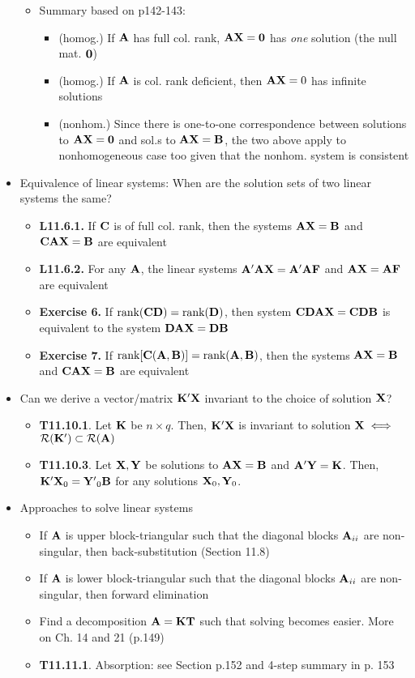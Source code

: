 \documentclass[a4paper, oneside]{book}
\begin{document}
\begin{itemize}
\begin{itemize}
	\item Summary based on p142-143:
		\begin{itemize}
		\item (homog.) If $\mathbf{A}$ has full col. rank, $\mathbf{AX}=\mathbf{0}$ has \textit{one} solution (\ie the null mat. $\mathbf{0}$)
		\item (homog.) If $\mathbf{A}$ is col. rank deficient, then $\mathbf{AX}=0$ has infinite solutions
		\item (nonhom.) Since there is one-to-one correspondence between solutions to $\mathbf{AX=0}$ and sol.s to $\mathbf{AX=B}$, the two above apply to nonhomogeneous case too given that the nonhom. system is consistent
		\end{itemize}
	\end{itemize}
\item Equivalence of linear systems: When are the solution sets of two linear systems the same?
	\begin{itemize}
	\item \textbf{L11.6.1.} If $\mathbf{C}$ is of full col. rank, then the systems $\mathbf{AX=B}$ and $\mathbf{CAX=B}$ are equivalent
	\item \textbf{L11.6.2.} For any $\mathbf{A}$, the linear systems $\mathbf{A'AX=A'AF}$ and $\mathbf{AX=AF}$ are equivalent
	\item \textbf{Exercise 6.} If $\text{rank}(\mathbf{CD})=\text{rank}(\mathbf{D})$, then system $\mathbf{CDAX}=\mathbf{CDB}$ is equivalent to the system $\mathbf{DAX}=\mathbf{DB}$
	\item \textbf{Exercise 7.} If $\text{rank}[\mathbf{C(A,B)}]=\text{rank}(\mathbf{A,B})$, then the systems $\mathbf{AX=B}$ and $\mathbf{CAX=B}$ are equivalent
	\end{itemize}
\item Can we derive a vector/matrix $\mathbf{K'X}$ invariant to the choice of solution $\mathbf{X}$?
	\begin{itemize}
	\item \textbf{T11.10.1}. Let $\mathbf{K}$ be $n\times q$. Then, $\mathbf{K'X}$ is invariant to solution $\mathbf{X} \iff$ $\mathcal{R}(\mathbf{K}') \subset \mathcal{R}(\mathbf{A})$
	\item \textbf{T11.10.3}. Let $\mathbf{X,Y}$ be solutions to $\mathbf{AX=B}$ and $\mathbf{A'Y=K}$. Then, $\mathbf{K'X}_0=\mathbf{Y'}_0\mathbf{B}$ for any solutions $\mathbf{X}_0,\mathbf{Y}_0$.
	\end{itemize}
\item Approaches to solve linear systems
	\begin{itemize}
	\item If $\mathbf{A}$ is upper block-triangular such that the diagonal blocks $\mathbf{A}_{ii}$ are non-singular, then back-substitution (Section 11.8)
	\item If $\mathbf{A}$ is lower block-triangular such that the diagonal blocks $\mathbf{A}_{ii}$ are non-singular, then forward elimination
	\item Find a decomposition $\mathbf{A=KT}$ such that solving becomes easier. More on Ch. 14 and 21 (p.149)
	\item \textbf{T11.11.1}. Absorption: see Section p.152 and 4-step summary in p. 153
	\end{itemize}
\end{itemize}
\end{document}
